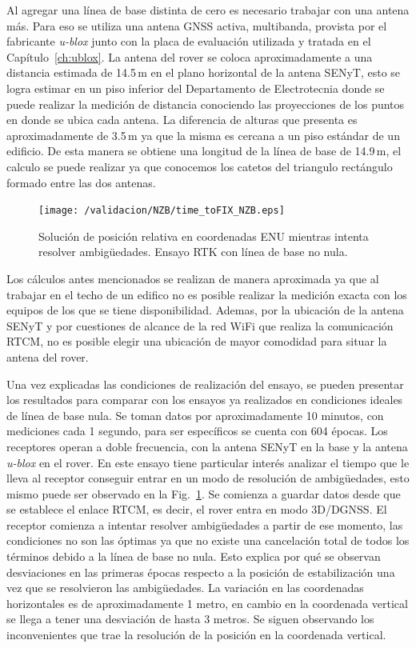 \documentclass[a4paper,12pt,oneside,onecolumn,final,openright]{book}%
\begin{document}
	Al agregar una línea de base distinta de cero es necesario trabajar con una antena más. Para eso se utiliza una antena GNSS activa, multibanda, provista por el fabricante \textit{u-blox} junto con la placa de evaluación utilizada y tratada en el Capítulo~\ref{ch:ublox}. La antena del rover se coloca aproximadamente a una distancia estimada de 14.5\,m en el plano horizontal de la antena SENyT, esto se logra estimar en un piso inferior del Departamento de Electrotecnia donde se puede realizar la medición de distancia conociendo las proyecciones de los puntos en donde se ubica cada antena. La diferencia de alturas que presenta es aproximadamente de 3.5\,m ya que la misma es cercana a un piso estándar de un edificio. De esta manera se obtiene una longitud de la línea de base de 14.9\,m, el calculo se puede realizar ya que conocemos los catetos del triangulo rectángulo formado entre las dos antenas. 
\begin{figure}[t]
\centering
 	\texttt{[image: /validacion/NZB/time\_toFIX\_NZB.eps]}
 	\caption{Solución de posición relativa en coordenadas ENU mientras intenta resolver ambigüedades. Ensayo RTK con línea de base no nula.}
  	\label{fig:time_toFIX_NZB}
\end{figure}
	Los cálculos antes mencionados se realizan de manera aproximada ya que al trabajar en el techo de un edifico no es posible realizar la medición exacta con los equipos de los que se tiene disponibilidad. Ademas, por la ubicación de la antena SENyT y por cuestiones de alcance de la red WiFi que realiza la comunicación RTCM, no es posible elegir una ubicación de mayor comodidad para situar la antena del rover.
	
	Una vez explicadas las condiciones de realización del ensayo, se pueden presentar los resultados para comparar con los ensayos ya realizados en condiciones ideales de línea de base nula. Se toman datos por aproximadamente 10 minutos, con mediciones cada 1 segundo, para ser específicos se cuenta con 604 épocas. Los receptores operan a doble frecuencia, con la antena SENyT en la base y la antena \textit{u-blox} en el rover. En este ensayo tiene particular interés analizar el tiempo que le lleva al receptor conseguir entrar en un modo de resolución de ambigüedades, esto mismo puede ser observado en la Fig.~\ref{fig:time_toFIX_NZB}. Se comienza a guardar datos desde que se establece el enlace RTCM, es decir, el rover entra en modo 3D/DGNSS. El receptor comienza a intentar resolver ambigüedades a partir de ese momento, las condiciones no son las óptimas ya que no existe una cancelación total de todos los términos debido a la línea de base no nula. Esto explica por qué se observan desviaciones en las primeras épocas respecto a la posición de estabilización una vez que se resolvieron las ambigüedades. La variación en las coordenadas horizontales es de aproximadamente 1 metro, en cambio en la coordenada vertical se llega a tener una desviación de hasta 3 metros. Se siguen observando los inconvenientes que trae la resolución de la posición en la coordenada vertical. 
	
\end{document}
